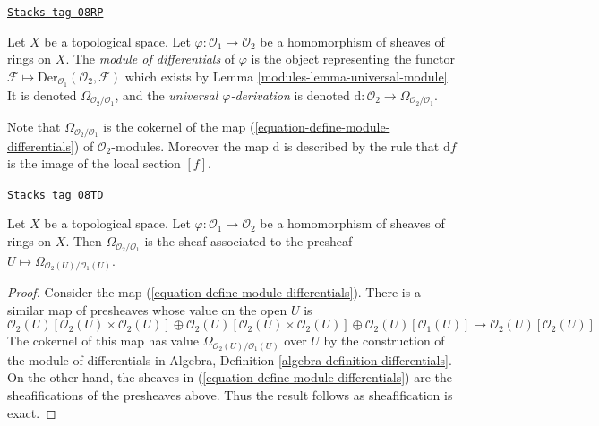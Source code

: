 \begin{definition}
\label{modules-definition-module-differentials}
\href{https://stacks.math.columbia.edu/tag/08RP}{\texttt{Stacks tag 08RP}}

Let $X$ be a topological space. Let $\varphi : \mathcal{O}_1 \to \mathcal{O}_2$
be a homomorphism of sheaves of rings on $X$. The {\it module of differentials}
of $\varphi$ is the object representing the functor
$\mathcal{F} \mapsto \text{Der}_{\mathcal{O}_1}(\mathcal{O}_2, \mathcal{F})$
which exists by Lemma \ref{modules-lemma-universal-module}.
It is denoted $\Omega_{\mathcal{O}_2/\mathcal{O}_1}$, and the {\it universal
$\varphi$-derivation} is denoted
$\text{d} : \mathcal{O}_2 \to \Omega_{\mathcal{O}_2/\mathcal{O}_1}$.
\end{definition}

Note that $\Omega_{\mathcal{O}_2/\mathcal{O}_1}$ is the cokernel of
the map (\ref{equation-define-module-differentials}) of
$\mathcal{O}_2$-modules. Moreover the map $\text{d}$ is described
by the rule that $\text{d}f$ is the image of the local section $[f]$.

\begin{lemma}
\label{modules-lemma-differentials-sheafify}
\href{https://stacks.math.columbia.edu/tag/08TD}{\texttt{Stacks tag 08TD}}

Let $X$ be a topological space. Let $\varphi : \mathcal{O}_1 \to \mathcal{O}_2$
be a homomorphism of sheaves of rings on $X$. Then
$\Omega_{\mathcal{O}_2/\mathcal{O}_1}$ is the sheaf associated to the
presheaf $U \mapsto \Omega_{\mathcal{O}_2(U)/\mathcal{O}_1(U)}$.
\end{lemma}

\begin{proof}
Consider the map (\ref{equation-define-module-differentials}). There is
a similar map of presheaves whose value on the open $U$ is
$$
\mathcal{O}_2(U)[\mathcal{O}_2(U) \times \mathcal{O}_2(U)] \oplus
\mathcal{O}_2(U)[\mathcal{O}_2(U) \times \mathcal{O}_2(U)] \oplus
\mathcal{O}_2(U)[\mathcal{O}_1(U)]
\longrightarrow
\mathcal{O}_2(U)[\mathcal{O}_2(U)]
$$
The cokernel of this map has value $\Omega_{\mathcal{O}_2(U)/\mathcal{O}_1(U)}$
over $U$ by the construction of the module of differentials in
Algebra, Definition \ref{algebra-definition-differentials}.
On the other hand, the sheaves in (\ref{equation-define-module-differentials})
are the sheafifications of the presheaves above. Thus the result follows
as sheafification is exact.
\end{proof}

